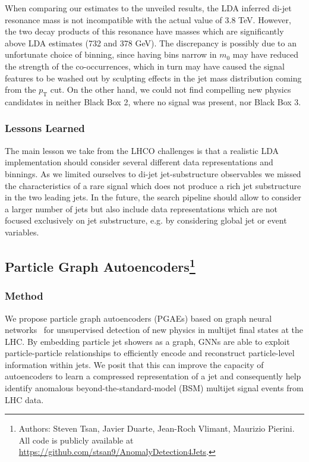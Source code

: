 \documentclass[a4paper,11pt]{article}
\begin{document}
When comparing our estimates to the unveiled results, the LDA inferred di-jet resonance mass is not incompatible with the actual value of 3.8 TeV. 
However, the two decay products of this resonance have masses which are significantly above LDA estimates (732 and 378 GeV). 
The discrepancy is possibly due to an unfortunate choice of binning, since having bins narrow in $m_0$  may have reduced the strength of the co-occurrences, which in turn may have caused the signal features to be washed out by sculpting effects in the jet mass distribution coming from the $p_\text{T}$ cut.
On the other hand, we could not find compelling new physics candidates in neither Black Box 2, where no signal was present, nor Black Box 3.

\subsubsection{Lessons Learned}
\label{sec:lessons}

The main lesson we take from the LHCO challenges is that a realistic LDA implementation should consider several different data representations and binnings. As we limited ourselves to di-jet jet-substructure observables we missed the characteristics of a rare signal which does not produce a rich jet substructure in the two leading jets.  In the future, the search pipeline should allow to consider a larger number of jets but also include data representations which are not focused exclusively on jet substructure, e.g. by considering global jet or event variables.



 \FloatBarrier

\subsection[Particle Graph Autoencoders]{Particle Graph Autoencoders\footnote{Authors: Steven Tsan, Javier Duarte, Jean-Roch Vlimant, Maurizio Pierini.  All code is publicly available at \url{https://github.com/stsan9/AnomalyDetection4Jets}.}}
\label{sec:pga}






\subsubsection{Method}
\label{sec:method}



We propose particle graph autoencoders (PGAEs) based on graph neural networks~\cite{1808887} for unsupervised detection of new physics in multijet final states at the LHC. 
By embedding particle jet showers as a graph, GNNs are able to exploit particle-particle relationships to efficiently encode and reconstruct particle-level information within jets.
We posit that this can improve the capacity of autoencoders to learn a compressed representation of a jet and consequently help identify anomalous beyond-the-standard-model (BSM) multijet signal events from LHC data.
\end{document}
